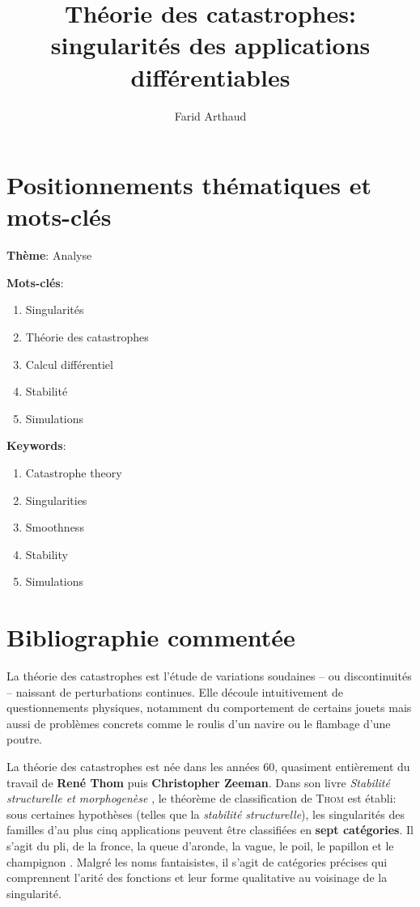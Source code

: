 \documentclass{article}
\begin{document}
\title{Théorie des catastrophes: singularités des applications différentiables}
\author{Farid Arthaud}
\maketitle

\section{Positionnements thématiques et mots-clés}

\textbf{Thème}: Analyse

\textbf{Mots-clés}:
\begin{enumerate}
    \item Singularités
    \item Théorie des catastrophes
    \item Calcul différentiel
    \item Stabilité
    \item Simulations
\end{enumerate}

\textbf{Keywords}:

\begin{enumerate}
    \item Catastrophe theory
    \item Singularities
    \item Smoothness
    \item Stability
    \item Simulations
\end{enumerate}

\section{Bibliographie commentée}

La théorie des catastrophes est l'étude de variations soudaines -- ou discontinuités -- naissant de perturbations continues.
Elle découle intuitivement de questionnements physiques, notamment du comportement de certains jouets \cite{bbcvid} mais aussi de problèmes concrets comme le roulis d'un navire \cite{poston} ou le flambage d'une poutre.

La théorie des catastrophes est née dans les années 60, quasiment entièrement du travail de \textbf{René Thom} puis \textbf{Christopher Zeeman}.
Dans son livre \textit{Stabilité structurelle et morphogenèse} \cite{thom}, le théorème de classification de \textsc{Thom} est établi: sous certaines hypothèses (telles que la \textit{stabilité structurelle}), les singularités des familles d'au plus cinq applications peuvent être classifiées en \textbf{sept catégories}.
Il s'agit du pli, de la fronce, la queue d'aronde, la vague, le poil, le papillon et le champignon \cite{wikipedia}.
Malgré les noms fantaisistes, il s'agit de catégories précises qui comprennent l'arité des fonctions et leur forme qualitative au voisinage de la singularité.
\end{document}
